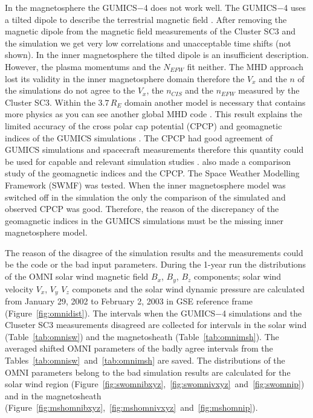 \documentclass[linenumbers,draft]{agujournal}
\begin{document}
In the magnetosphere the GUMICS$-$4 does not work well. The GUMICS$-$4 uses a tilted dipole to describe the terrestrial magnetic field \citep{janhunen12:_gumic_mhd}. After removing the magnetic dipole from the magnetic field measurements of the Cluster SC3 and the simulation we get very low correlations and unacceptable time shifts (not shown). In the inner magnetosphere the tilted dipole is an insufficient description. However, the plasma momentums and the $N_{EFW}$ fit neither. The MHD approach lost its validity in the inner magnetosphere domain therefore the $V_{x}$ and the $n$ of the simulations do not agree to the $V_{x}$, the $n_{CIS}$ and the $n_{EFW}$ measured by the Cluster SC3. Within the $3.7\,R_{E}$ domain another model is necessary that contains more physics as you can see another global MHD code \citep{lyon04:_lyon_fedder_mobar_lfm_mhd,raeder08:_openg_simul_themis_mission,powell99:_solut_adapt_upwin_schem_ideal_magnet,toth12:_adapt}. This result explains the limited accuracy of the cross polar cap potential (CPCP) and  geomagnetic indices of the GUMICS simulations \citep{juusola14:_statis_gumic_mhd}. The CPCP had good agreement of GUMICS simulations and spacecraft measurements therefore this quantity could be used for capable and relevant simulation studies \citep{lakka18:_cross_polar_cap_satur_gumic}. \citet{haiducek17:_swmf_global_magnet_simul_januar} also made a comparison study of the geomagnetic indices and the CPCP. The Space Weather Modelling Framework (SWMF) was tested. When the inner magnetosphere model was switched off in the simulation the only the comparison of the simulated and observed CPCP was good. Therefore, the reason of the discrepancy of the geomagnetic indices in the GUMICS simulations must be the missing inner magnetosphere model.


The reason of the disagree of the simulation results and the measurements could be the code or the bad input parameters. During the 1-year run the distributions of the OMNI solar wind magnetic field $B_{x}$, $B_{y}$, $B_{z}$ components; solar wind velocity $V_{x}$, $V_{y}$ $V_{z}$ componets and the solar wind dynamic pressure are calculated from January 29, 2002 to February 2, 2003 in GSE reference frame (Figure~\ref{fig:omnidist}). The intervals when the GUMICS$-$4 simulations and the Cluseter SC3 measurements disagreed are collected for intervals in the solar wind (Table~\ref{tab:omnisw}) and the magnetosheath (Table~\ref{tab:omnimsh}). The averaged shifted OMNI parameters of the badly agree intervals from the Tables~\ref{tab:omnisw}~and~\ref{tab:omnimsh} are saved. The distributions of the OMNI parameters belong to the bad simulation results are calculated for the solar wind region (Figure~\ref{fig:swomnibxyz},~\ref{fig:swomnivxyz}~and~\ref{fig:swomnip}) and in the magnetosheath (Figure~\ref{fig:mshomnibxyz},~\ref{fig:mshomnivxyz}~and~\ref{fig:mshomnip}).
\end{document}

